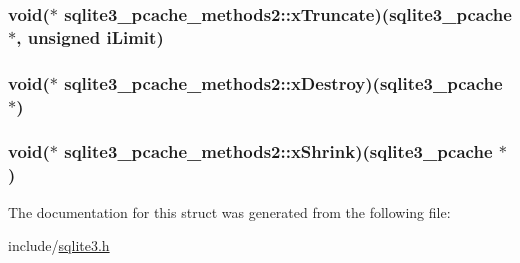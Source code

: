 \hypertarget{structsqlite3__pcache__methods2_7c565709ab91dbe7feb5b82c684ba604}{
\subsubsection[xTruncate]{\setlength{\rightskip}{0pt plus 5cm}void($\ast$ {\bf sqlite3\_\-pcache\_\-methods2::xTruncate})({\bf sqlite3\_\-pcache} $\ast$, unsigned iLimit)}}
\label{structsqlite3__pcache__methods2_7c565709ab91dbe7feb5b82c684ba604}


\hypertarget{structsqlite3__pcache__methods2_144d6e899889e80e00f93fb6c83359e2}{
\subsubsection[xDestroy]{\setlength{\rightskip}{0pt plus 5cm}void($\ast$ {\bf sqlite3\_\-pcache\_\-methods2::xDestroy})({\bf sqlite3\_\-pcache} $\ast$)}}
\label{structsqlite3__pcache__methods2_144d6e899889e80e00f93fb6c83359e2}


\hypertarget{structsqlite3__pcache__methods2_f00c121e9c39b1df292711013c226ba5}{
\subsubsection[xShrink]{\setlength{\rightskip}{0pt plus 5cm}void($\ast$ {\bf sqlite3\_\-pcache\_\-methods2::xShrink})({\bf sqlite3\_\-pcache} $\ast$)}}
\label{structsqlite3__pcache__methods2_f00c121e9c39b1df292711013c226ba5}




The documentation for this struct was generated from the following file:\begin{CompactItemize}
\item 
include/\hyperlink{sqlite3_8h}{sqlite3.h}\end{CompactItemize}
